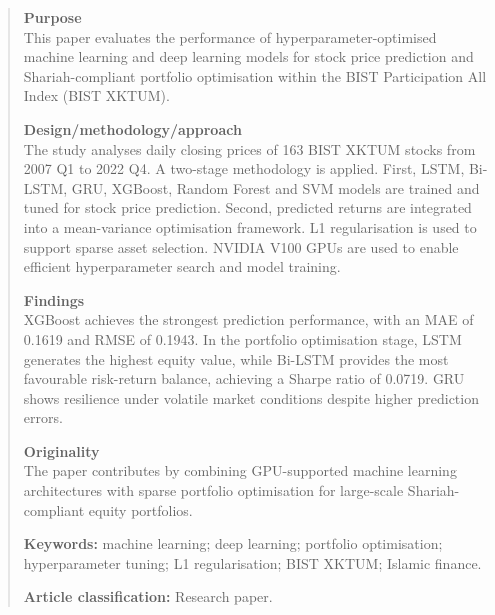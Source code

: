 \begin{abstract}

    \noindent\textbf{Purpose} \\
    This paper evaluates the performance of hyperparameter-optimised machine learning and deep learning models for stock price prediction and Shariah-compliant portfolio optimisation within the BIST Participation All Index (BIST XKTUM).
    
    \noindent\textbf{Design/methodology/approach} \\
    The study analyses daily closing prices of 163 BIST XKTUM stocks from 2007 Q1 to 2022 Q4. A two-stage methodology is applied. First, LSTM, Bi-LSTM, GRU, XGBoost, Random Forest and SVM models are trained and tuned for stock price prediction. Second, predicted returns are integrated into a mean-variance optimisation framework. L1 regularisation is used to support sparse asset selection. NVIDIA V100 GPUs are used to enable efficient hyperparameter search and model training.
    
    \noindent\textbf{Findings} \\
    XGBoost achieves the strongest prediction performance, with an MAE of 0.1619 and RMSE of 0.1943. In the portfolio optimisation stage, LSTM generates the highest equity value, while Bi-LSTM provides the most favourable risk-return balance, achieving a Sharpe ratio of 0.0719. GRU shows resilience under volatile market conditions despite higher prediction errors.
    
    \noindent\textbf{Originality} \\
    The paper contributes by combining GPU-supported machine learning architectures with sparse portfolio optimisation for large-scale Shariah-compliant equity portfolios.
    
    \noindent\textbf{Keywords:} machine learning; deep learning; portfolio optimisation; hyperparameter tuning; L1 regularisation; BIST XKTUM; Islamic finance.
    
    \noindent\textbf{Article classification:} Research paper.
    
    \end{abstract}